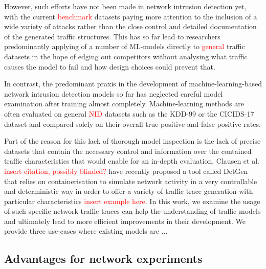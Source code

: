 \documentclass[sigconf]{acmart}
\begin{document}
However, such efforts have not been made in network intrusion detection yet, with the current \textcolor{red}{benchmark} datasets paying more attention to the inclusion of a wide variety of attacks rather than the close control and detailed documentation of the generated traffic structures. This has so far lead to researchers predominantly applying of a number of ML-models directly to \textcolor{red}{general} traffic datasets in the hope of edging out competitors without analysing what traffic causes the model to fail and how design choices could prevent that.


In contrast, the predominant praxis in the development of machine-learning-based network intrusion detection models so far has neglected careful model examination after training almost completely. Machine-learning methods are often evaluated on general \textcolor{red}{NID} datasets such as the KDD-99 or the CICIDS-17 dataset and compared solely on their overall true positive and false positive rates. 



Part of the reason for this lack of thorough model inspection is the lack of precise datasets that contain the necessary control and information over the contained traffic characteristics that would enable for an in-depth evaluation. Clausen et al. \textcolor{red}{insert citation, possibly blinded?} have recently proposed a tool called DetGen that relies on containerisation to simulate network activity in a very controllable and deterministic way in order to offer a variety of traffic trace generation with particular characteristics \textcolor{red}{insert example here}. In this work, we examine the usage of such specific network traffic traces can help the understanding of traffic models and ultimately lead to more efficient improvements in their development. We provide three use-cases where existing models are ...


\subsection*{Advantages for network experiments}%

\end{document}
